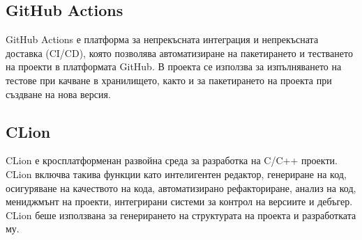 \subsection{GitHub Actions}
GitHub Actions е платформа за непрекъсната интеграция и непрекъсната доставка (CI/CD), която позволява автоматизиране на пакетирането и тестването на проекти в платформата GitHub. В проекта се използва за изпълняването на тестове при качване в хранилището, както и за пакетирането на проекта при създване на нова версия.

\subsection{CLion}
CLion е кросплатформенан развойна среда за разработка на C/C++ проекти. CLion включва такива функции като интелигентен редактор, генериране на код, осигуряване на качеството на кода, автоматизирано рефакториране, анализ на код, мениджмънт на проекти, интегрирани системи за контрол на версиите и дебъгер. CLion беше използвана за генерирането на структурата на проекта и разработката му.